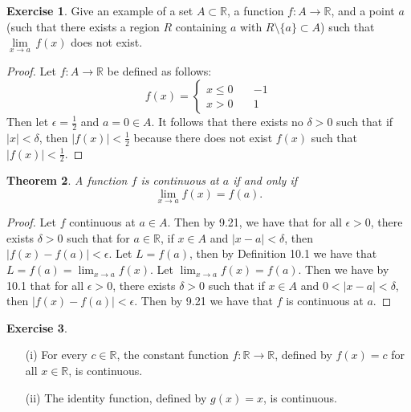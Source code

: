 \documentclass[12pt]{article}
\newcommand{\bbR}{\mathbb{R}}
\providecommand{\abs}[1]{\lvert #1 \rvert}
\providecommand{\sarr}{\rightarrow}
\providecommand{\arr}{\longrightarrow}
\renewcommand{\_}[1]{\underline{ #1 }}
\newtheorem{theorem}{Theorem}[section]
\theoremstyle{definition}
\newtheorem{exercise}[theorem]{Exercise}
\numberwithin{equation}{subsection}
\begin{document}
\begin{exercise}  
Give an example of a set $A\subset \bbR$, a function $f\colon A\arr \bbR$, and a point $a$ (such that
there exists a region $R$ containing $a$ with $R\setminus\{a\}\subset A$) such that 
$\underset{x \sarr a}{\lim} \, f(x)$ does not exist.
\end{exercise}

\begin{proof}
Let $f: A \to \bbR$ be defined as follows: \newline
\[
f(x) = \begin{cases}
x \leq 0 \quad &-1 \\
x > 0 \quad &1
\end{cases}
\] 
Then let $\epsilon = \frac{1}{2}$ and $a = 0 \in A$. It follows that there exists no $\delta > 0$ such that if $\abs{x} < \delta$, then $\abs{f(x)} < \frac{1}{2}$ because there does not exist $f(x)$ such that $\abs{f(x)} < \frac{1}{2}$.
\end{proof}

\begin{theorem}  A function $f$ is continuous at $a$ if and only if
\[
\lim_{x \sarr a} f(x) = f(a).
\]
\end{theorem}

\begin{proof}
Let $f$ continuous at $a \in A$. Then by 9.21, we have that for all $\epsilon > 0$, there exists $\delta > 0$ such that for $a \in \bbR$, if $x \in A$ and $\abs{x - a} < \delta$, then $\abs{f(x) - f(a)} < \epsilon$. Let $L = f(a)$, then by Definition 10.1 we have that $L = f(a) = \lim_{x \to a}f(x)$. \newline
Let $\lim_{x \to a}f(x) = f(a)$. Then we have by 10.1 that for all $\epsilon > 0$, there exists $\delta > 0$ such that if $x \in A$ and $0 < \abs{x - a} < \delta$, then $\abs{f(x) - f(a)} < \epsilon$. Then by 9.21 we have that $f$ is continuous at $a$.
\end{proof}

\begin{exercise}
\begin{itemize}
\item[(i)] For every $c\in\bbR$, the constant function $f:\bbR\to\bbR$, defined by $f(x)=c$ for all $x\in\bbR$, is continuous.
\item[(ii)] The identity function, defined by $g(x)=x$, is continuous.
\end{itemize}
\end{exercise}
\end{document}
